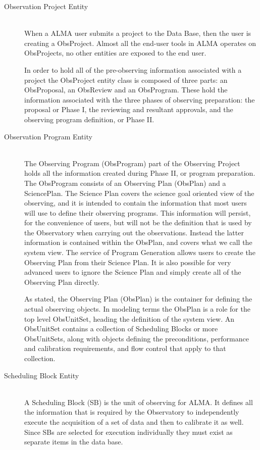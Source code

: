 \begin{description}
\item[Observation Project Entity] \hfill \\
When a ALMA user submits a project to the Data Base, then the user is creating a ObsProject. Almost all the end-user tools in ALMA operates on ObsProjects, no other entities are exposed to the end user.

In order to hold all of the pre-observing information associated with a project the ObsProject entity class is composed of three parts: an ObsProposal, an ObsReview and an ObsProgram. These hold the information associated with the three phases of observing preparation: the proposal or Phase I, the reviewing and resultant approvals, and the observing program definition, or Phase II.

\item[Observation Program Entity] \hfill \\
The Observing Program (ObsProgram) part of the Observing Project holds all the information created during Phase II, or program preparation. The ObsProgram consists of an Observing Plan (ObsPlan) and a SciencePlan. The Science Plan covers the science goal oriented view of the observing, and it is intended to contain the information that most users will use to define their observing programs. This information will persist, for the convenience of users, but will not be the definition that is used by the Observatory when carrying out the observations. Instead the latter information is contained within the ObsPlan, and covers what we call the system view. The service of Program Generation allows users to create the Observing Plan from their Science Plan. It is also possible for very advanced users to ignore the Science Plan and simply create all of the Observing Plan directly.

As stated, the Observing Plan (ObsPlan) is the container for defining the actual observing objects. In modeling terms the ObsPlan is a role for the top level ObsUnitSet, heading the definition of the system view. An ObsUnitSet contains a collection of Scheduling Blocks or more ObsUnitSets, along with objects defining the preconditions, performance and calibration requirements, and flow control that apply to that collection.


\item[Scheduling Block Entity] \hfill \\
A Scheduling Block (SB) is the unit of observing for ALMA. It defines all the information that is required by the Observatory to independently execute the acquisition of a set of data and then to calibrate it as well. Since SBs are selected for execution individually they must exist as separate items in the data base.


\end{description}
